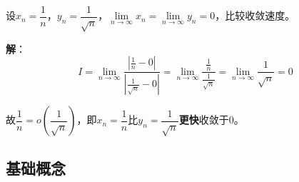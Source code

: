 \documentclass[a4paper,12pt]{article}
\begin{document}
    \begin{analysisbox}[示例]
        设$x_n = \dfrac{1}{n}$，$y_n = \dfrac{1}{\sqrt{n}}$，$\lim\limits_{n\to\infty} x_n = \lim\limits_{n\to\infty} y_n = 0$，比较收敛速度。

        \textbf{解}：
        \[
            I = \lim_{n\to\infty} \frac{\left|\frac{1}{n} - 0\right|}{\left|\frac{1}{\sqrt{n}} - 0\right|} = \lim_{n\to\infty} \frac{\frac{1}{n}}{\frac{1}{\sqrt{n}}} = \lim_{n\to\infty} \frac{1}{\sqrt{n}} = 0
        \]

        故$\dfrac{1}{n} = o\!\left(\dfrac{1}{\sqrt{n}}\right)$，即$x_n = \dfrac{1}{n}$比$y_n = \dfrac{1}{\sqrt{n}}$\textbf{更快}收敛于$0$。
    \end{analysisbox}

    \subsection{基础概念}
\end{document}
